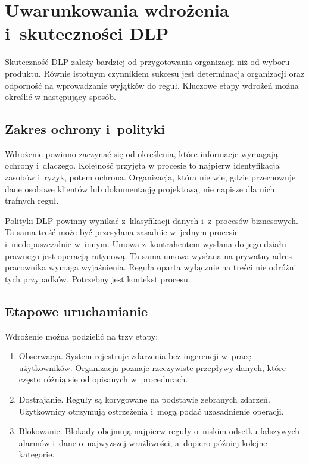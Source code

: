 \documentclass[12pt,a4paper]{article}
\begin{document}
\section{Uwarunkowania wdrożenia i~skuteczności DLP}

Skuteczność DLP zależy bardziej od przygotowania organizacji niż od wyboru produktu. 
Równie istotnym czynnikiem sukcesu jest determinacja organizacji oraz odporność na 
wprowadzanie wyjątków do reguł. Kluczowe etapy wdrożeń można określić w następujący sposób.

\subsection{Zakres ochrony i~polityki}

Wdrożenie powinno zaczynać się od określenia, które informacje wymagają
ochrony i~dlaczego. Kolejność przyjęta w procesie to najpierw identyfikacja zasobów i~ryzyk, potem ochrona.
Organizacja, która nie wie, gdzie przechowuje dane osobowe klientów lub dokumentację projektową, nie napisze
dla nich trafnych reguł.

Polityki DLP powinny wynikać z~klasyfikacji danych i~z~procesów biznesowych.
Ta sama treść może być przesyłana zasadnie w~jednym procesie
i~niedopuszczalnie w~innym. Umowa z~kontrahentem wysłana do jego działu
prawnego jest operacją rutynową. Ta sama umowa wysłana na prywatny adres
pracownika wymaga wyjaśnienia. Reguła oparta wyłącznie na treści nie odróżni
tych przypadków. Potrzebny jest kontekst procesu.

\subsection{Etapowe uruchamianie}

Wdrożenie można podzielić na trzy etapy:
\begin{enumerate}
  \item Obserwacja. System rejestruje zdarzenia bez ingerencji w~pracę
    użytkowników. Organizacja poznaje rzeczywiste przepływy danych, które
    często różnią się od opisanych w~procedurach.
  \item Dostrajanie. Reguły są korygowane na podstawie zebranych zdarzeń.
    Użytkownicy otrzymują ostrzeżenia i~mogą podać uzasadnienie operacji.
  \item Blokowanie. Blokady obejmują najpierw reguły o~niskim odsetku
    fałszywych alarmów i~dane o~najwyższej wrażliwości, a~dopiero później
    kolejne kategorie.
\end{enumerate}
\end{document}
